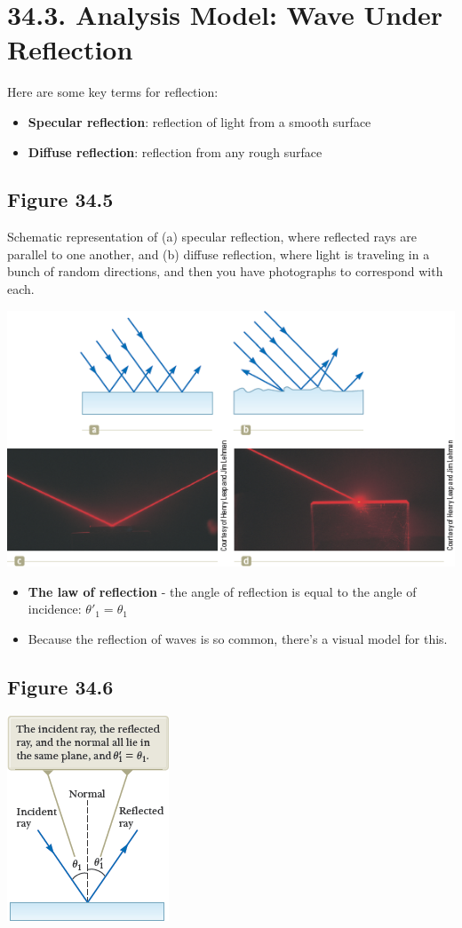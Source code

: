 \documentclass[12pt, letterpaper]{article}
\begin{document}
\section*{34.3. Analysis Model: Wave Under Reflection}
Here are some key terms for reflection:
\begin{itemize}
    \item \textbf{Specular reflection}: reflection of light from a smooth surface
    \item \textbf{Diffuse reflection}: reflection from any rough surface
\end{itemize}

\subsection*{Figure 34.5}
Schematic representation of (a) specular reflection, where reflected rays are parallel to one another, and (b) diffuse reflection, where light is traveling in a bunch of random directions, and then you have photographs to correspond with each.
\begin{center}
    \includegraphics{34.5.png}
\end{center}
\begin{itemize}
    \item \textbf{The law of reflection} - the angle of reflection is equal to the angle of incidence: $\theta'_{1}=\theta_{1}$
    \item Because the reflection of waves is so common, there's a visual model for this.
\end{itemize}

\subsection*{Figure 34.6}
\begin{center}
    \includegraphics{34.6.png}
\end{center}
\end{document}
